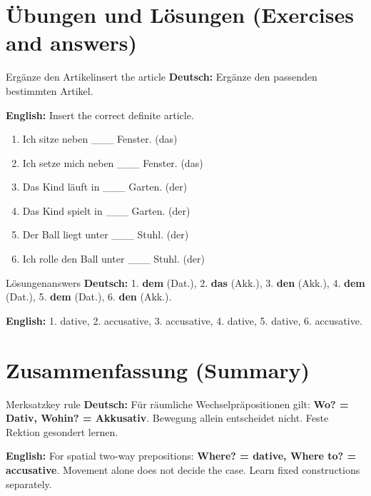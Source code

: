\documentclass[a4paper,11pt]{article}
\newcommand{\GermanText}[1]{\textbf{Deutsch: }#1\par}
\newcommand{\EnglishText}[1]{{\small\color{SoftGray}\textbf{English: }#1\par}}
\begin{document}
\section{Übungen und Lösungen (Exercises and answers)}
\begin{grammarentry}{Ergänze den Artikel}{insert the article}
\GermanText{Ergänze den passenden bestimmten Artikel.}
\EnglishText{Insert the correct definite article.}
\end{grammarentry}
\begin{enumerate}
\item Ich sitze neben \_\_\_ Fenster. (das)
\item Ich setze mich neben \_\_\_ Fenster. (das)
\item Das Kind läuft in \_\_\_ Garten. (der)
\item Das Kind spielt in \_\_\_ Garten. (der)
\item Der Ball liegt unter \_\_\_ Stuhl. (der)
\item Ich rolle den Ball unter \_\_\_ Stuhl. (der)
\end{enumerate}
\begin{grammarentry}{Lösungen}{answers}
\GermanText{1. \textbf{dem} (Dat.), 2. \textbf{das} (Akk.), 3. \textbf{den} (Akk.), 4. \textbf{dem} (Dat.), 5. \textbf{dem} (Dat.), 6. \textbf{den} (Akk.).}
\EnglishText{1. dative, 2. accusative, 3. accusative, 4. dative, 5. dative, 6. accusative.}
\end{grammarentry}
\section{Zusammenfassung (Summary)}
\begin{grammarentry}{Merksatz}{key rule}
\GermanText{Für räumliche Wechselpräpositionen gilt: \textbf{Wo? = Dativ, Wohin? = Akkusativ}. Bewegung allein entscheidet nicht. Feste Rektion gesondert lernen.}
\EnglishText{For spatial two-way prepositions: \textbf{Where? = dative, Where to? = accusative}. Movement alone does not decide the case. Learn fixed constructions separately.}
\end{grammarentry}
\end{document}
